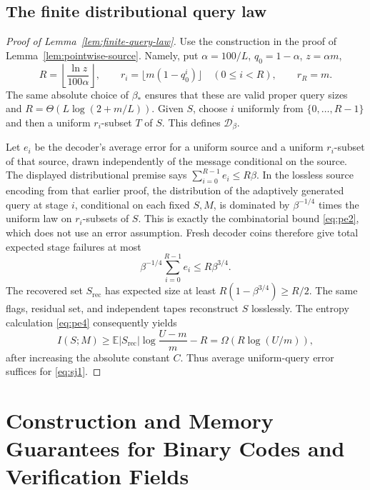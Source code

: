 \documentclass[11pt,letterpaper]{article}
\numberwithin{equation}{section}
\newcommand{\E}{\mathbb E}
\begin{document}
\subsection{The finite distributional query law}
\label{app:finite-query-law-proof}

\begin{proof}[Proof of Lemma~\ref{lem:finite-query-law}]
Use the construction in the proof of Lemma~\ref{lem:pointwise-source}.
Namely, put $\alpha=100/L$, $q_0=1-\alpha$, $z=\alpha m$,
\[
 R=\left\lfloor\frac{\ln z}{100\alpha}\right\rfloor,
 \qquad r_i=\lfloor m(1-q_0^i)\rfloor\quad(0\le i<R),
 \qquad r_R=m.
\]
The same absolute choice of $\beta_*$ ensures that these are valid proper query sizes and $R=\Theta(L\log(2+m/L))$.
Given $S$, choose $i$ uniformly from $\{0,\ldots,R-1\}$ and then a uniform $r_i$-subset $T$ of $S$.
This defines $\mathcal D_\beta$.

Let $e_i$ be the decoder's average error for a uniform source and a uniform $r_i$-subset of that source, drawn independently of the message conditional on the source.
The displayed distributional premise says $\sum_{i=0}^{R-1}e_i\le R\beta$.
In the lossless source encoding from that earlier proof, the distribution of the adaptively generated query at stage $i$, conditional on each fixed $S,M$, is dominated by $\beta^{-1/4}$ times the uniform law on $r_i$-subsets of $S$.
This is exactly the combinatorial bound \eqref{eq:pe2}, which does not use an error assumption.
Fresh decoder coins therefore give total expected stage failures at most
\begin{equation}
\beta^{-1/4}\sum_{i=0}^{R-1}e_i\le R\beta^{3/4}.
                                                               \label{eq:sj2}
\end{equation}
The recovered set $S_{\mathrm{rec}}$ has expected size at least $R(1-\beta^{3/4})\ge R/2$.
The same flags, residual set, and independent tapes reconstruct $S$ losslessly.
The entropy calculation \eqref{eq:pe4} consequently yields
\[
 I(S;M)\ge \E|S_{\mathrm{rec}}|\log\frac{U-m}{m}-R
          =\Omega(R\log(U/m)),
\]
after increasing the absolute constant $C$.
Thus average uniform-query error suffices for \eqref{eq:sj1}.
\end{proof}



\section{Construction and Memory Guarantees for Binary Codes and Verification Fields}
\label{sec:binary-codec-upgrade}
\end{document}
